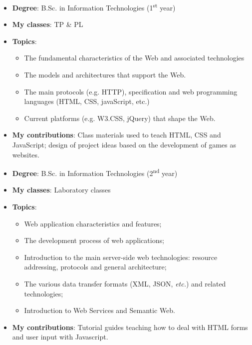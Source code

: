 \begin{itemize}
    \item \textbf{Degree}: B.Sc. in Information Technologies (1\textsuperscript{st} year)
    \item \textbf{My classes}: TP \& PL
    \item \textbf{Topics}:
    \begin{itemize}
        \item The fundamental characteristics of the Web and associated technologies
        \item The models and architectures that support the Web.
        \item The main protocols (e.g. HTTP), specification and web programming languages (HTML, CSS, javaScript, etc.)
        \item Current platforms (e.g. W3.CSS, jQuery) that shape the Web.
    \end{itemize}
    \item \textbf{My contributions}: Class materials used to teach HTML, CSS and JavaScript; design of project ideas based on the development of games as websites.
\end{itemize}

\begin{itemize}
    \item \textbf{Degree}: B.Sc. in Information Technologies (2\textsuperscript{nd} year)
    \item \textbf{My classes}: Laboratory classes
    \item \textbf{Topics}:
    \begin{itemize}
        \item Web application characteristics and features;
        \item The development process of web applications;
        \item Introduction to the main server-side web technologies: resource addressing, protocols and general architecture;
        \item The various data transfer formats (XML, JSON, \emph{etc.}) and related technologies;
        \item Introduction to Web Services and Semantic Web.
    \end{itemize}
    \item \textbf{My contributions}: Tutorial guides teaching how to deal with HTML forms and user input with Javascript.
\end{itemize}

